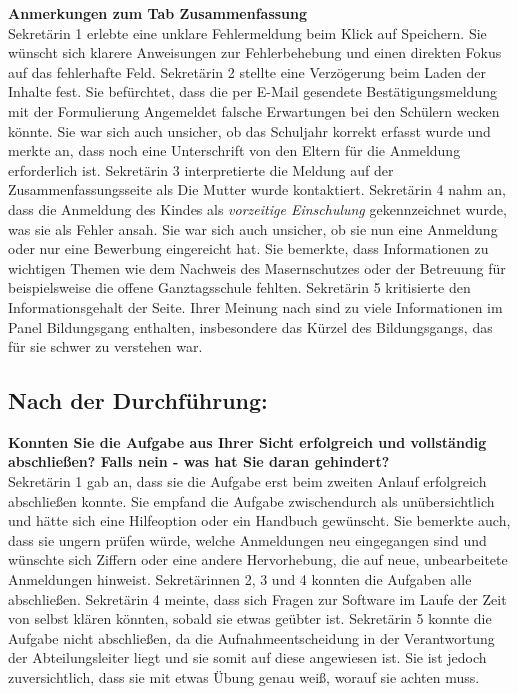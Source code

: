 \textbf{Anmerkungen zum Tab \glqq Zusammenfassung\grqq{}}\\
Sekretärin 1 erlebte eine unklare Fehlermeldung beim Klick auf \glqq Speichern\grqq{}. Sie wünscht sich klarere Anweisungen zur Fehlerbehebung und einen direkten Fokus auf das fehlerhafte Feld.
Sekretärin 2 stellte eine Verzögerung beim Laden der Inhalte fest. Sie befürchtet, dass die per E-Mail gesendete Bestätigungsmeldung mit der Formulierung \glqq Angemeldet\grqq{} falsche Erwartungen bei den Schülern wecken könnte. Sie war sich auch unsicher, ob das Schuljahr korrekt erfasst wurde und merkte an, dass noch eine Unterschrift von den Eltern für die Anmeldung erforderlich ist.
Sekretärin 3 interpretierte die Meldung auf der Zusammenfassungsseite als \glqq Die Mutter wurde kontaktiert\grqq{}.
Sekretärin 4 nahm an, dass die Anmeldung des Kindes als \textit{vorzeitige Einschulung} gekennzeichnet wurde, was sie als Fehler ansah. Sie war sich auch unsicher, ob sie nun eine \glqq Anmeldung\grqq{} oder nur eine \glqq Bewerbung\grqq{} eingereicht hat. Sie bemerkte, dass Informationen zu wichtigen Themen wie dem Nachweis des Masernschutzes oder der Betreuung für beispielsweise die offene Ganztagsschule fehlten.
Sekretärin 5 kritisierte den Informationsgehalt der Seite. Ihrer Meinung nach sind zu viele Informationen im Panel \glqq Bildungsgang\grqq{} enthalten, insbesondere das Kürzel des Bildungsgangs, das für sie schwer zu verstehen war.

\subsection{Nach der Durchführung:}

\textbf{Konnten Sie die Aufgabe aus Ihrer Sicht erfolgreich und vollständig abschließen? Falls nein - was hat Sie daran gehindert?}\\
Sekretärin 1 gab an, dass sie die Aufgabe erst beim zweiten Anlauf erfolgreich abschließen konnte. Sie empfand die Aufgabe zwischendurch als unübersichtlich und hätte sich eine Hilfeoption oder ein Handbuch gewünscht. Sie bemerkte auch, dass sie ungern prüfen würde, welche Anmeldungen neu eingegangen sind und wünschte sich Ziffern oder eine andere Hervorhebung, die auf neue, unbearbeitete Anmeldungen hinweist.
Sekretärinnen 2, 3 und 4 konnten die Aufgaben alle abschließen. Sekretärin 4 meinte, dass sich Fragen zur Software im Laufe der Zeit von selbst klären könnten, sobald sie etwas geübter ist.
Sekretärin 5 konnte die Aufgabe nicht abschließen, da die Aufnahmeentscheidung in der Verantwortung der Abteilungsleiter liegt und sie somit auf diese angewiesen ist. Sie ist jedoch zuversichtlich, dass sie mit etwas Übung genau weiß, worauf sie achten muss.

